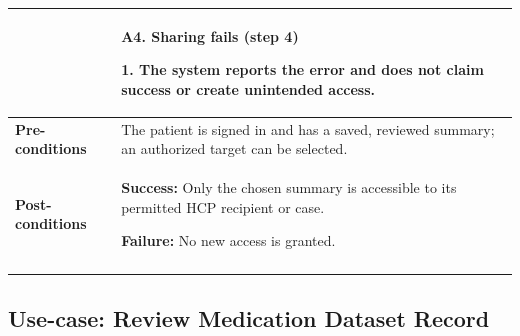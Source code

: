 \begin{longtable}{|p{}|p{}|}
{\begin{tabular}{|p{}|p{}|}
\textbf{Alternative Flows} &
\textbf{A4. Sharing fails (step 4)}\par
1. The system reports the error and does not claim success or create unintended access.
\\ \hline
\textbf{Pre-conditions} & The patient is signed in and has a saved, reviewed summary; an authorized target can be selected. \\ \hline
\textbf{Post-conditions} & \textbf{Success:} Only the chosen summary is accessible to its permitted HCP recipient or case.\par
\textbf{Failure:} No new access is granted. \\ \hline
\end{tabular}}\\
\end{longtable}


\clearpage
\subsection{Use-case: Review Medication Dataset Record}
\label{uc:uc-14}

